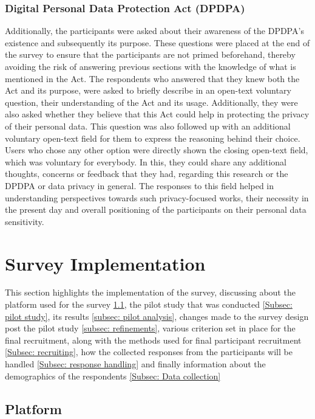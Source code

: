 \subsubsection{Digital Personal Data Protection Act (DPDPA)} \label{Subsubsec: DPDPA}

Additionally, the participants were asked about their awareness of the DPDPA's existence and subsequently its purpose. These questions were placed at the end of the survey to ensure that the participants are not primed beforehand, thereby avoiding the risk of answering previous sections with the knowledge of what is mentioned in the Act. The respondents who answered that they knew both the Act and its purpose, were asked to briefly describe in an open-text voluntary question, their understanding of the Act and its usage. Additionally, they were also asked whether they believe that this Act could help in protecting the privacy of their personal data. This question was also followed up with an additional voluntary open-text field for them to express the reasoning behind their choice. Users who chose any other option were directly shown the closing open-text field, which was voluntary for everybody. In this, they could share any additional thoughts, concerns or feedback that they had, regarding this research or the DPDPA or data privacy in general. The responses to this field helped in understanding perspectives towards such privacy-focused works, their necessity in the present day and overall positioning of the participants on their personal data sensitivity.

 
\section{Survey Implementation} \label{Sec: Implementation}
This section highlights the implementation of the survey, discussing about the platform used for the survey \ref{Subsec: platform}, the pilot study that was conducted \ref{Subsec: pilot study}, its results \ref{subsec: pilot analysis}, changes made to the survey design post the pilot study \ref{subsec: refinements}, various criterion set in place for the final recruitment, along with the methods used for final participant recruitment \ref{Subsec: recruiting}, how the collected responses from the participants will be handled \ref{Subsec: response handling} and finally information about the demographics of the respondents \ref{Subsec: Data collection} 

\subsection{Platform}  \label{Subsec: platform}

